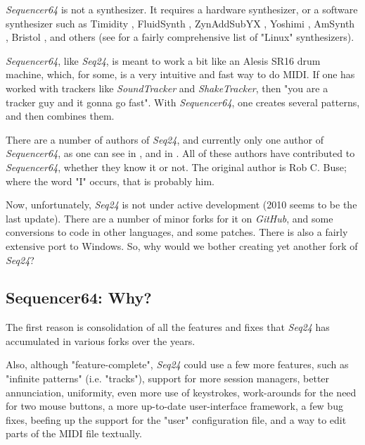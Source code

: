 \documentclass[
 11pt,
 twoside,
 a4paper,
 headinclude,
 footinclude,
 final                                 %
]{article}
\begin{document}
   \textsl{Sequencer64} is not a synthesizer.  It requires a hardware
   synthesizer, or a software synthesizer such as Timidity \cite{timidity},
   FluidSynth \cite{fluidsynth}, ZynAddSubYX \cite{zynaddsubfx}, Yoshimi
   \cite{yoshimi} \cite{yoshimi2}, AmSynth \cite{amsynth}, Bristol
   \cite{bristol}, and others (see \cite{linuxsynths} for a fairly
   comprehensive list of "Linux" synthesizers).

   \textsl{Sequencer64}, like \textsl{Seq24},
   is meant to work a bit like an Alesis SR16 drum machine,
   which, for some, is a very intuitive and fast way to do MIDI.
   If one has worked with trackers like \textsl{SoundTracker} and
   \textsl{ShakeTracker}, then "you are a tracker guy and it gonna go fast".
   With \textsl{Sequencer64}, one creates several patterns, and then
   combines them.

   There are a number of authors of \textsl{Seq24}, and currently only
   one author of \textsl{Sequencer64},
   as one can see in ,
   and in .
   All of these authors have contributed to \textsl{Sequencer64}, whether
   they know it or not.
   The original author is Rob C. Buse; where the word "I" occurs, that is
   probably him.

   Now, unfortunately, \textsl{Seq24} is not under active
   development (2010 seems to be the last update).  There are a number of
   minor forks for it on \textsl{GitHub}, and some conversions
   to code in other languages, and some patches.
   There is also a fairly extensive port to Windows.
   So, why would we bother creating yet another fork of \textsl{Seq24}?

\subsection{Sequencer64: Why?}
\label{subsec:introduction_seq64_vs_others}

   The first reason is consolidation of all the features and fixes that
   \textsl{Seq24} has accumulated in various forks over the years.

   Also, although "feature-complete", \textsl{Seq24} could use a few more
   features, such as "infinite patterns" (i.e. "tracks"), support for more
   session managers, better annunciation, uniformity, even more use of
   keystrokes, work-arounds for the need for two mouse buttons, a more
   up-to-date user-interface framework, a few bug fixes, beefing up the support
   for the "user" configuration file, and a way to edit parts of the MIDI file
   textually.
\end{document}
